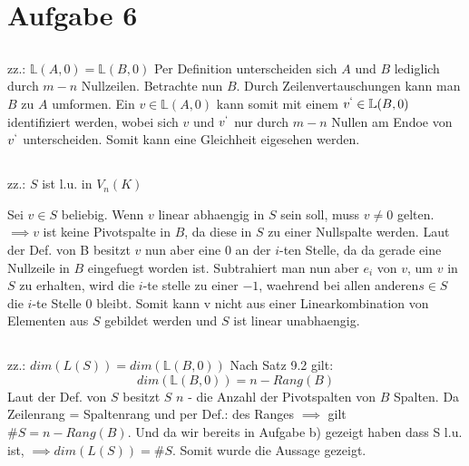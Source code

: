 \documentclass{article}
\begin{document}
\section{Aufgabe 6}
\subsection{}
zz.: $\mathbb{L}(A,0) = \mathbb{L}(B,0)$
Per Definition unterscheiden sich $A$ und $B$ lediglich durch $m -n$ Nullzeilen. Betrachte nun $B$. Durch Zeilenvertauschungen kann man $B$ zu $A$ umformen. Ein $v \in \mathbb{L}(A,0)$ kann somit mit einem $v^{`} \in \mathbb{L}(B,0)$ identifiziert werden, wobei sich $v$ und $v^{`}$ nur durch $m - n$ Nullen am Endoe von $v^{`}$ unterscheiden. Somit kann eine Gleichheit eigesehen werden.
\subsection{}
zz.: $S$ ist l.u. in $V_{n} (K)$

Sei $v \in S$ beliebig. Wenn $v$ linear abhaengig in $S$ sein soll, muss $v \neq  0$ gelten.
$\implies v$ ist keine Pivotspalte in $B$, da diese in $S$ zu einer Nullspalte werden. Laut der Def. von B besitzt $v$ nun aber eine 0 an der $i$-ten Stelle, da da gerade eine Nullzeile in $B$ eingefuegt worden ist. Subtrahiert man nun aber $e_{i}$ von $v$, um $v$ in $S$ zu erhalten, wird die $i$-te stelle zu einer $-1$, waehrend bei allen anderen$s \in S$ die $i$-te Stelle 0 bleibt. Somit kann v nicht aus einer Linearkombination von Elementen aus $S$ gebildet werden und $S$ ist linear unabhaengig.
\subsection{}
zz.: $dim(L(S)) = dim(\mathbb{L}(B,0))$
Nach Satz 9.2 gilt:
$$ dim(\mathbb{L}(B,0)) =  n - Rang(B)$$
Laut der Def. von $S$ besitzt $S$ $n$ - die Anzahl der Pivotspalten von $B$ Spalten. Da Zeilenrang = Spaltenrang und per Def.: des Ranges $\implies$ gilt $\#S = n - Rang(B)$. Und da wir bereits in Aufgabe b) gezeigt haben dass S l.u. ist, $\implies dim(L(S)) = \#S$. Somit wurde die Aussage gezeigt.
\end{document}
